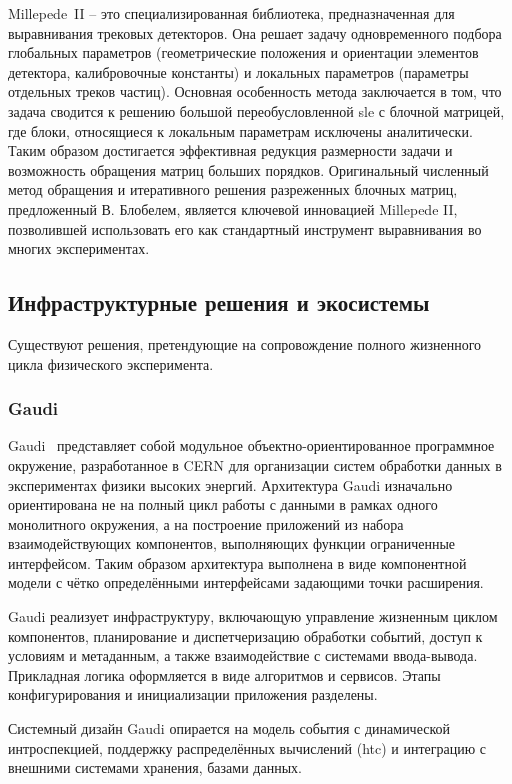 Millepede~II\cite{millipede-blobel2009} -- это специализированная
библиотека, предназначенная для выравнивания трековых детекторов.
Она решает задачу одновременного подбора глобальных параметров
(геометрические положения и ориентации элементов детектора,
калибровочные константы) и локальных параметров (параметры
отдельных треков частиц). Основная особенность метода
заключается в том, что задача сводится к решению большой
переобусловленной \acrshort{sle} с блочной матрицей, где блоки, относящиеся
к локальным параметрам исключены аналитически.
Таким образом достигается эффективная редукция размерности
задачи и возможность обращения матриц больших порядков.
Оригинальный численный метод обращения и итеративного
решения разреженных блочных матриц, предложенный
В. Блобелем, является ключевой инновацией Millepede II,
позволившей использовать его как стандартный инструмент
выравнивания во многих экспериментах.

\subsection{Инфраструктурные решения и экосистемы}

Существуют решения, претендующие на сопровождение
полного жизненного цикла физического эксперимента.

\subsubsection{Gaudi}

Gaudi~\cite{gaudi-framework-1} представляет собой модульное
объектно-ориентированное программное окружение, разработанное
в CERN для организации систем обработки данных в экспериментах
физики высоких энергий. Архитектура Gaudi
изначально ориентирована не на полный цикл работы
с данными в рамках одного монолитного окружения, а на
построение приложений из набора взаимодействующих компонентов,
выполняющих функции ограниченные интерфейсом. Таким образом
архитектура выполнена в виде компонентной модели с чётко
определёнными интерфейсами задающими точки расширения.

Gaudi реализует инфраструктуру,
включающую управление жизненным циклом компонентов,
планирование и диспетчеризацию обработки событий, доступ к
условиям и метаданным, а также взаимодействие с системами
ввода-вывода. Прикладная логика оформляется в виде
алгоритмов и сервисов. Этапы конфигурирования и инициализации
приложения разделены.

Системный дизайн Gaudi опирается на модель события с динамической
интроспекцией, поддержку распределённых
вычислений (\acrshort{htc}) и интеграцию с внешними системами хранения,
базами данных.

